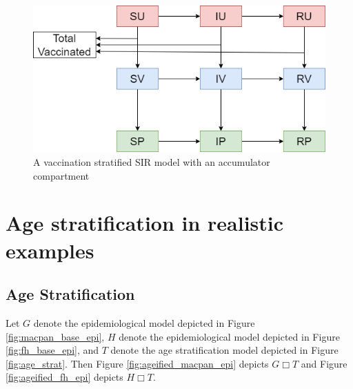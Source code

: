 \begin{appendices}
\begin{figure}
    \centering
    \includegraphics[width=\textwidth]{images/vax_accumulator.png}
    \caption{A vaccination stratified SIR model with an accumulator compartment}
    \label{fig:vax_acc}
\end{figure}

\FloatBarrier

\section{Age stratification in realistic examples}\label{secC1}

\subsection{Age Stratification}
    Let $G$ denote the epidemiological model depicted in Figure \ref{fig:macpan_base_epi}, $H$ denote the epidemiological model depicted in Figure \ref{fig:fh_base_epi}, and $T$ denote the age stratification model depicted in Figure \ref{fig:age_strat}. Then Figure \ref{fig:ageified_macpan_epi} depicts $G\Box T$ and Figure \ref{fig:ageified_fh_epi} depicts $H\Box T$.


\end{appendices}
